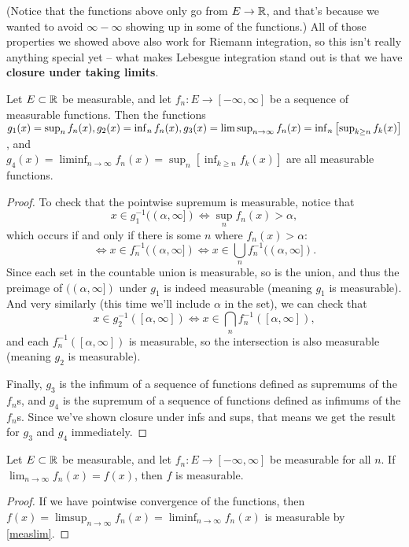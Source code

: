 (Notice that the functions above only go from $E \to \mathbb R$, and that's because we wanted to avoid $\infty - \infty$ showing up in some of the functions.) All of those properties we showed above also work for Riemann integration, so this isn't really anything special yet -- what makes Lebesgue integration stand out is that we have \textbf{closure under taking limits}.

\begin{theorem}\label{measlim}
Let $E \subset \mathbb R$ be measurable, and let $f_n: E \to [-\infty, \infty]$ be a sequence of measurable functions. Then the functions $g_1(x) = \sup_n f_n(x), \\ g_2(x) = \inf_n f_n(x), \\ g_3(x) = \limsup_{n \to \infty} f_n(x) = \inf_{n} \left[\sup_{k \ge n} f_k(x)\right]$, and \\ $g_4(x) = \liminf_{n \to \infty} f_n(x) = \sup_n \left[\inf_{k \ge n} f_k(x) \right]$ are all measurable functions.
\end{theorem}
\begin{proof}
To check that the pointwise supremum is measurable, notice that
\[
    x \in g_1^{-1}((\alpha, \infty]) \iff \sup_n f_n(x) > \alpha,
\]
which occurs if and only if there is some $n$ where $f_n(x) > \alpha$: 
\[
    \iff x \in f_n^{-1}((\alpha, \infty]) \iff x \in \bigcup_n f_n^{-1}((\alpha, \infty]).
\]
Since each set in the countable union is measurable, so is the union, and thus the preimage of $((\alpha, \infty])$ under $g_1$ is indeed measurable (meaning $g_1$ is measurable). And very similarly (this time we'll include $\alpha$ in the set), we can check that
\[
    x \in g_2^{-1}([\alpha, \infty]) \iff x \in \bigcap_n f_n^{-1}([\alpha, \infty]),
\]
and each $f_n^{-1}([\alpha, \infty])$ is measurable, so the intersection is also measurable (meaning $g_2$ is measurable).

Finally, $g_3$ is the infimum of a sequence of functions defined as supremums of the $f_n$s, and $g_4$ is the supremum of a sequence of functions defined as infimums of the $f_n$s. Since we've shown closure under infs and sups, that means we get the result for $g_3$ and $g_4$ immediately.
\end{proof}

\begin{corollary}
Let $E \subset \mathbb R$ be measurable, and let $f_n: E \to [-\infty, \infty]$ be measurable for all $n$. If $\lim_{n \to \infty} f_n(x) = f(x)$, then $f$ is measurable.
\end{corollary}
\begin{proof}
If we have pointwise convergence of the functions, then $f(x) = \limsup_{n \to \infty} f_n(x) = \liminf_{n \to \infty} f_n(x)$ is measurable by \cref{measlim}.
\end{proof}

